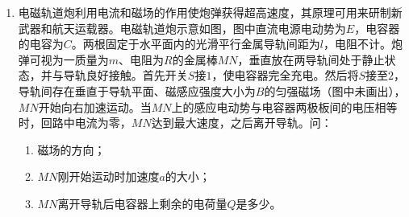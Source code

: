 \begin{enumerate}


\newpage
\item
{}
电磁轨道炮利用电流和磁场的作用使炮弹获得超高速度，其原理可用来研制新武器和航天运载器。电磁轨道炮示意如图，图中直流电源电动势为$ E $，电容器的电容为$ C $。两根固定于水平面内的光滑平行金属导轨间距为$ l $，电阻不计。炮弹可视为一质量为$ m $、电阻为$ R $的金属棒$ MN $，垂直放在两导轨间处于静止状态，并与导轨良好接触。首先开关$ S $接$ 1 $，使电容器完全充电。然后将$ S $接至$ 2 $，导轨间存在垂直于导轨平面、磁感应强度大小为$ B $的匀强磁场（图中未画出），$ MN $开始向右加速运动。当$ MN $上的感应电动势与电容器两极板间的电压相等时，回路中电流为零，$ MN $达到最大速度，之后离开导轨。问：
\begin{enumerate}
\renewcommand{\labelenumi}{\arabic{enumi}.}
\item
磁场的方向；
\item 
$ MN $刚开始运动时加速度$ a $的大小；
\item 
$ MN $离开导轨后电容器上剩余的电荷量$ Q $是多少。



\end{enumerate}
\begin{figure}[h!]
\flushright

\end{figure}



\end{enumerate}

